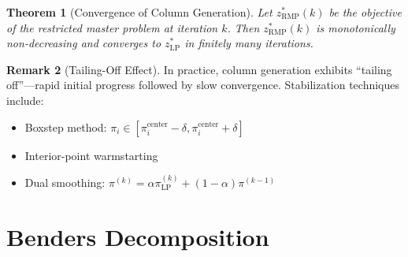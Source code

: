 \documentclass[11pt,a4paper]{book}
\newtheorem{theorem}{Theorem}[chapter]
\theoremstyle{definition}
\newtheorem{remark}[theorem]{Remark}
\begin{document}
\begin{theorem}[Convergence of Column Generation]
Let $z^*_{\text{RMP}}(k)$ be the objective of the restricted master problem
at iteration $k$. Then $z^*_{\text{RMP}}(k)$ is monotonically non-decreasing
and converges to $z^*_{\text{LP}}$ in finitely many iterations.
\end{theorem}

\begin{remark}[Tailing-Off Effect]
In practice, column generation exhibits ``tailing off''---rapid initial
progress followed by slow convergence. Stabilization techniques include:
\begin{itemize}
  \item Boxstep method: $\pi_i \in [\pi_i^{\text{center}} - \delta, \pi_i^{\text{center}} + \delta]$
  \item Interior-point warmstarting
  \item Dual smoothing: $\pi^{(k)} = \alpha \pi^{(k)}_{\text{LP}} + (1-\alpha) \pi^{(k-1)}$
\end{itemize}
\end{remark}

\section{Benders Decomposition}

\medskip
\noindent{}\medskip
\end{document}
